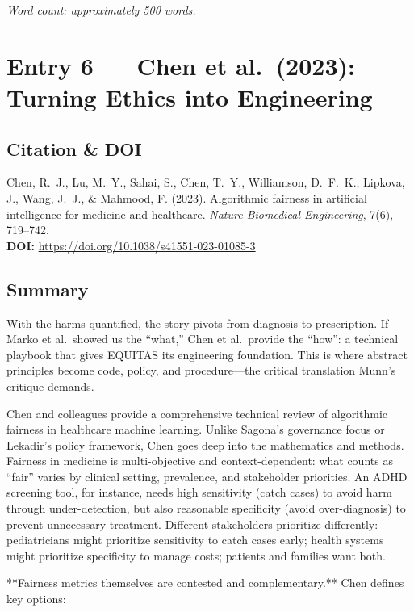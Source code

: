 \documentclass[12pt,twoside]{article}
\begin{document}
\emph{Word count: approximately 500 words.}

\newpage

\section*{Entry 6 --- Chen et al.\ (2023): Turning Ethics into Engineering}

\subsection*{Citation \& DOI}

Chen, R.\ J., Lu, M.\ Y., Sahai, S., Chen, T.\ Y., Williamson, D.\ F.\ K., Lipkova, J., Wang, J.\ J., \& Mahmood, F. (2023). Algorithmic fairness in artificial intelligence for medicine and healthcare. \textit{Nature Biomedical Engineering}, 7(6), 719--742. \\
\textbf{DOI:} \href{https://doi.org/10.1038/s41551-023-01085-3}{https://doi.org/10.1038/s41551-023-01085-3}

\subsection*{Summary}

With the harms quantified, the story pivots from diagnosis to prescription. If Marko et al.\ showed us the ``what,'' Chen et al.\ provide the ``how'': a technical playbook that gives EQUITAS its engineering foundation. This is where abstract principles become code, policy, and procedure---the critical translation Munn's critique demands.

Chen and colleagues provide a comprehensive technical review of algorithmic fairness in healthcare machine learning. Unlike Sagona's governance focus or Lekadir's policy framework, Chen goes deep into the mathematics and methods. Fairness in medicine is multi-objective and context-dependent: what counts as ``fair'' varies by clinical setting, prevalence, and stakeholder priorities. An ADHD screening tool, for instance, needs high sensitivity (catch cases) to avoid harm through under-detection, but also reasonable specificity (avoid over-diagnosis) to prevent unnecessary treatment. Different stakeholders prioritize differently: pediatricians might prioritize sensitivity to catch cases early; health systems might prioritize specificity to manage costs; patients and families want both.

**Fairness metrics themselves are contested and complementary.** Chen defines key options:
\end{document}
